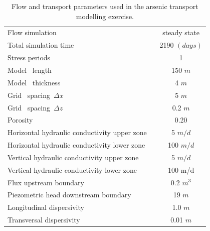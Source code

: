 \begin{table}
\caption{Flow and transport parameters used in the arsenic transport modelling exercise.}
\begin{center}
\begin{tabular}{lc}
\toprule
Flow simulation                     & steady state \\
Total simulation time        & 2190 $(days)$ \\
Stress periods                       & 1 \\
Model \  length\                &  150 $m$           \\
Model \  thickness\          &  4  $m$           \\
Grid \ spacing\ $\Delta x $               &    5  $m$          \\
Grid \ spacing\ $\Delta z $                 &    0.2  $m$          \\
Porosity\     $            $         &  0.20           \\
Horizontal hydraulic conductivity upper zone \                  &  5 $m/d$         \\ 
Horizontal hydraulic conductivity lower zone \          &  100 $m/d$         \\ 
Vertical hydraulic conductivity upper zone \          &  5 $m/d$         \\ 
Vertical hydraulic conductivity lower zone \         &  100 m/d         \\ 
Flux upstream boundary\         &    0.2  $m^{3}$    \\ 
Piezometric head downstream boundary\               &  19 $m$          \\ 
Longitudinal dispersivity\          &  1.0 $m$         \\ 
Transversal  dispersivity\          &  0.01 $m$         \\ 
\bottomrule

\end{tabular}
\label{arse_setup}
\end{center}
\end{table}


